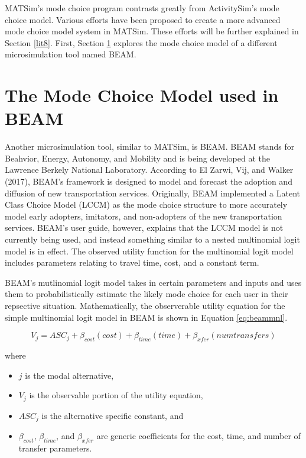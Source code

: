 \documentclass[12pt, oneside, openright]{byuthesis}
\providecommand{\tightlist}{%
  \setlength{\itemsep}{0pt}\setlength{\parskip}{0pt}}
\begin{document}
MATSim's mode choice program contrasts greatly from ActivitySim's mode choice model. Various efforts have been proposed to create a more advanced mode choice model system in MATSim. These efforts will be further explained in Section \ref{lit8}. First, Section \ref{lit7} explores the mode choice model of a different microsimulation tool named BEAM.

\hypertarget{lit7}{%
\section{The Mode Choice Model used in BEAM}\label{lit7}}

Another microsimulation tool, similar to MATSim, is BEAM. BEAM stands for Beahvior, Energy, Autonomy, and Mobility and is being developed at the Lawrence Berkely National Laboratory. According to El Zarwi, Vij, and Walker (2017), BEAM's framework is designed to model and forecast the adoption and diffusion of new transportation services. Originally, BEAM implemented a Latent Class Choice Model (LCCM) as the mode choice structure to more accurately model early adopters, imitators, and non-adopters of the new transportation services. BEAM's user guide, however, explains that the LCCM model is not currently being used, and instead something similar to a nested multinomial logit model is in effect. The observed utility function for the multinomial logit model includes parameters relating to travel time, cost, and a constant term.

BEAM's mutlinomial logit model takes in certain parameters and inputs and uses them to probabilistically estimate the likely mode choice for each user in their repsective situation. Mathematically, the observerable utility equation for the simple multinomial logit model in BEAM is shown in Equation \eqref{eq:beammnl}.

\begin{equation}
  V_j = ASC_j + \beta_{cost}(cost) + \beta_{time}(time) + \beta_{xfer}(numtransfers) 
    \label{eq:beammnl}
\end{equation}

where

\begin{itemize}
\tightlist
\item
  \(j\) is the modal alternative,
\item
  \(V_j\) is the observable portion of the utility equation,
\item
  \(ASC_j\) is the alternative specific constant, and
\item
  \(\beta_{cost}\), \(\beta_{time}\), and \(\beta_{xfer}\) are generic coefficients for the cost, time, and number of transfer parameters.
\end{itemize}
\end{document}
